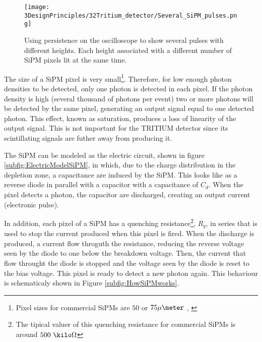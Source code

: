 \begin{figure}[htbp]
\centering
\texttt{[image: 3DesignPrinciples/32Tritium\_detector/Several\_SiPM\_pulses.png]}
\caption{Using persistence on the oscilloscope to show several pulses with different heights. Each height associated with a different number of  SiPM pixels lit at the same time.\label{fig:PulsesOfSiPM}}
\end{figure}

The size of a SiPM pixel is very small\footnote{Pixel sizes for commercial SiPMs are $50$ or $75\mu\meter$ \cite{DataSheetHammamatsu_1_SiPM_50}, \cite{DataSheetHammamatsu_1_SiPM_75}}. Therefore, for low enough photon densities to be detected, only one photon is detected in each pixel. If the photon density is high (several thousand of photons per event) two or more photons will be detected by the same pixel, generating an output signal equal to one detected photon. This effect, known as saturation, produces a loss of linearity of the output signal. This is not important for the TRITIUM detector since its scintillating signals are futher away from producing it. %

The SiPM can be modeled as the electric circuit, shown in figure \ref{subfig:ElectricModelSiPM}, in which, due to the charge distribution in the depletion zone, a capacitance are induced by the SiPM. This looks like as a reverse diode in parallel with a capacitor with a capacitance of $C_d$. When the pixel detects a photon, the capacitor are discharged, creating an output current (electronic pulse).

In addition, each pixel of a SiPM has a quenching resistance\footnote{The tipical valuer of this quenching resistance for commercial SiPMs is around $500~\kilo\Omega$}, $R_q$, in series that is used to stop the current produced when this pixel is fired. When the discharge is produced, a current flow throguth the resistance, reducing the reverse voltage seen by the diode to one below the breakdown voltage. Then, the current that flow throught the diode is stopped and the voltage seen by the diode is reset to the bias voltage. This pixel is ready to detect a new photon again. This behaviour is schematicaly shown in Figure \ref{subfig:HowSiPMworks}.

